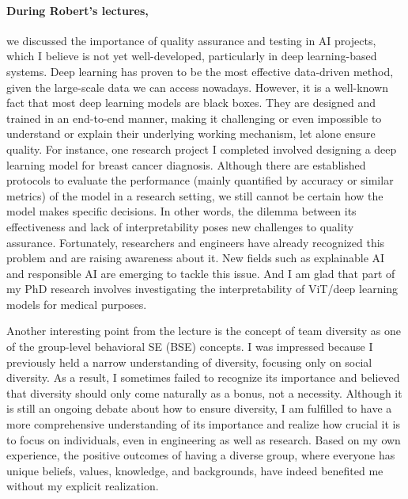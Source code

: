\documentclass[11pt]{article}
\begin{document}
\paragraph{During Robert's lectures,}  we discussed the importance of quality assurance and testing in AI projects, which I believe is not yet well-developed, particularly in deep learning-based systems. 
Deep learning has proven to be the most effective data-driven method, given the large-scale data we can access nowadays. 
However, it is a well-known fact that most deep learning models are black boxes. 
They are designed and trained in an end-to-end manner, making it challenging or even impossible to understand or explain their underlying working mechanism, let alone ensure quality.
For instance, one research project I completed involved designing a deep learning model for breast cancer diagnosis. 
Although there are established protocols to evaluate the performance (mainly quantified by accuracy or similar metrics) of the model in a research setting, we still cannot be certain how the model makes specific decisions. 
In other words, the dilemma between its effectiveness and lack of interpretability poses new challenges to quality assurance. 
Fortunately, researchers and engineers have already recognized this problem and are raising awareness about it. 
New fields such as explainable AI and responsible AI are emerging to tackle this issue.
And I am glad that part of my PhD research involves investigating the interpretability of ViT/deep learning models for medical purposes.

Another interesting point from the lecture is the concept of team diversity as one of the group-level behavioral SE (BSE) concepts. 
I was impressed because I previously held a narrow understanding of diversity, focusing only on social diversity. 
As a result, I sometimes failed to recognize its importance and believed that diversity should only come naturally as a bonus, not a necessity. 
Although it is still an ongoing debate about how to ensure diversity, I am fulfilled to have a more comprehensive understanding of its importance and realize how crucial it is to focus on individuals, even in engineering as well as research. 
Based on my own experience, the positive outcomes of having a diverse group, where everyone has unique beliefs, values, knowledge, and backgrounds, have indeed benefited me without my explicit realization.
\end{document}
